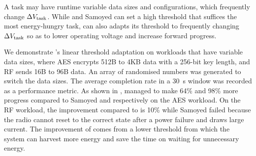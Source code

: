 

A task may have runtime variable data sizes and configurations, which frequently change $\Delta V_{\text{task}}$.
While \debs{} and Samoyed can set a high threshold that suffices the most energy-hungry task, \nn can also adapts its threshold to frequently changing $\Delta V_{\text{task}}$ so as to lower operating voltage and increase forward progress.

We demonstrate \nn{}'s linear threshold adaptation on workloads that have variable data sizes, where AES encrypts 512B to 4KB data with a 256-bit key length, and RF sends 16B to 96B data. 
An array of randomised numbers was generated to switch the data sizes. 
The average completion rate in a \SI{30}{\second} window was recorded as a performance metric.
As shown in , \nn{} managed to make 64\% and 98\% more progress compared to Samoyed and \debs{} respectively on the AES workload. On the RF workload, the improvement compared to \debs{} is 10\% while Samoyed failed because the radio cannot reset to the correct state after a power failure and draws large current. 
The improvement of \nn{} comes from a lower threshold from which the system can harvest more energy and save the time on waiting for unnecessary energy. 




